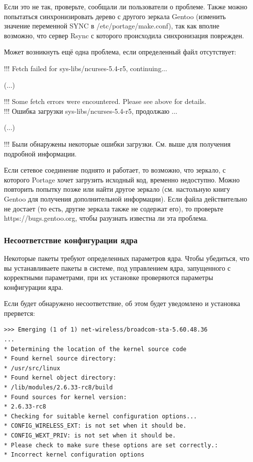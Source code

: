 \documentclass[10pt]{book}
\begin{document}
Если это не так, проверьте, сообщали ли пользователи о проблеме. Также можно попытаться синхронизировать дерево с другого зеркала Gentoo (изменить значение переменной SYNC в /etc/portage/make.conf), так как вполне возможно, что сервер Rsync с которого происходила синхронизация поврежден.

Может возникнуть ещё одна проблема, если определенный  файл отсутствует:
 \begin{tcolorbox}
!!! Fetch failed for sys-libs/ncurses-5.4-r5, continuing...

(...)

!!! Some fetch errors were encountered. Please see above for details. \\

!!! Ошибка загрузки sys-libs/ncurses-5.4-r5, продолжаю ...

(...)

!!! Были обнаружены некоторые ошибки загрузки. См. выше для получения подробной информации. 
\end{tcolorbox}
Если сетевое соединение поднято и работает, то возможно, что зеркало, с которого Portage хочет загрузить исходный код, временно недоступно. Можно повторить попытку позже или найти другое зеркало (см. настольную книгу Gentoo для получения дополнительной информации). Если файла действительно не достает (то есть, другие зеркала также не содержат его), то проверьте https://bugs.gentoo.org, чтобы разузнать известна ли эта проблема.

\subsubsection{Несоответствие конфигурации ядра}
Некоторые пакеты требуют определенных параметров ядра. Чтобы убедиться, что вы устанавливаете пакеты в системе, под управлением ядра, запущенного с корректными параметрами, при их установке проверяются параметры конфигурации ядра.

Если будет обнаружено несоответствие, об этом будет уведомлено и установка прервется:
 \begin{tcolorbox}
\begin{lstlisting}
>>> Emerging (1 of 1) net-wireless/broadcom-sta-5.60.48.36
...
* Determining the location of the kernel source code
* Found kernel source directory:
* /usr/src/linux
* Found kernel object directory:
* /lib/modules/2.6.33-rc8/build
* Found sources for kernel version:
* 2.6.33-rc8
* Checking for suitable kernel configuration options...
* CONFIG_WIRELESS_EXT: is not set when it should be.
* CONFIG_WEXT_PRIV: is not set when it should be.
* Please check to make sure these options are set correctly.:
* Incorrect kernel configuration options
\end{lstlisting}
\end{tcolorbox}
\end{document}
